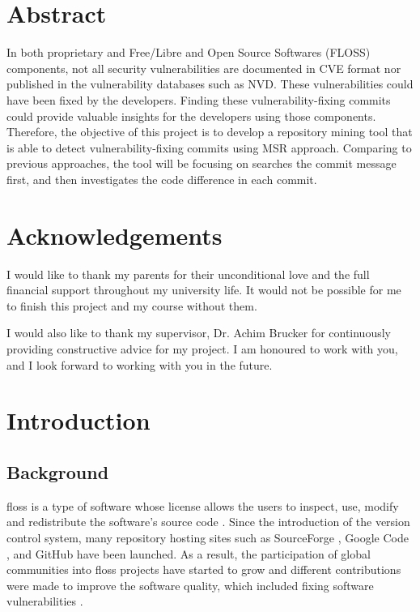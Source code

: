 \documentclass[12pt, a4paper]{report}
\begin{document}
\newpage

\chapter*{Abstract}
In both proprietary and Free/Libre and Open Source Softwares (FLOSS) components, not all security
vulnerabilities are documented in CVE format nor published in the vulnerability databases such as
NVD. These vulnerabilities could have been fixed by the developers. Finding these
vulnerability-fixing commits could provide valuable insights for the developers using those
components. Therefore, the objective of this project is to develop a repository mining tool that is
able to detect vulnerability-fixing commits using MSR approach. Comparing to previous approaches,
the tool will be focusing on searches the commit message first, and then investigates the code
difference in each commit.

\chapter*{Acknowledgements}
I would like to thank my parents for their unconditional love and the full financial support
throughout my university life. It would not be possible for me to finish this project and my course
without them.

I would also like to thank my supervisor, Dr. Achim Brucker for continuously providing constructive
advice for my project. I am honoured to work with you, and I look forward to working with you in the
future.

\newpage

\tableofcontents

\listoffigures

\listoftables

\newpage


\chapter{Introduction}
\section{Background}
\acrfull{floss} is a type of software whose license allows the users to inspect, use, modify and
redistribute the software's source code \cite{crowston_2012}. Since the introduction of the version
control system, many repository hosting sites such as SourceForge \cite{sourceforge}, Google Code
\cite{google_code}, and GitHub \cite{github} have been launched. As a result, the participation of
global communities into \acrshort{floss} projects have started to grow and different contributions
were made to improve the software quality, which included fixing software vulnerabilities
\cite{dabbish_2012}.
\end{document}

